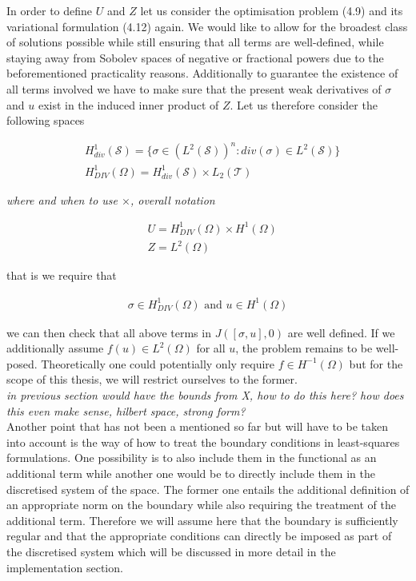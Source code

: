 \documentclass[../draft_1.tex]{subfiles}
\begin{document}
In order to define $U$ and $Z$ let us consider the optimisation problem (4.9) and its variational formulation (4.12) again. We would like to allow for the broadest class of solutions possible while still ensuring that all terms are well-defined, while staying away from Sobolev spaces of negative or fractional powers due to the beforementioned practicality reasons. Additionally to guarantee the existence of all terms involved we have to make sure that the present weak derivatives of $\sigma$ and $u$ exist in the induced inner product of $Z$. Let us therefore consider the following spaces 
\begin{ceqn}
	\begin{align}
	&H_{div}^1(\mathcal{S}) = \{\sigma \in (L^2(\mathcal{S}))^n : div (\sigma) \in L^2(\mathcal{S})\} \\
    &H_{DIV}^1(\Omega) = H_{div}^1(\mathcal{S}) \times L_2(\mathcal{T}) 
    	\end{align}
\end{ceqn}
\textit{where and when to use $\times$, overall notation}
\begin{ceqn}
	\begin{align}
    & U = H_{DIV}^1(\Omega) \times H^1(\Omega) \\
    & Z = L^2(\Omega)
	\end{align}
\end{ceqn}
that is we require that 
\begin{ceqn}
	\begin{align}
\sigma \in H_{DIV}^1(\Omega) \text{  and  } u \in H^1(\Omega) 
	\end{align}
\end{ceqn}
we can then check that all above terms in $J([\sigma, u], 0)$ are well defined. If we additionally assume $f(u) \in L^2(\Omega)$ for all $u$, the problem remains to be well-posed. Theoretically one could potentially only require $f \in H^{-1}(\Omega)$ but for the scope of this thesis, we will restrict ourselves to the former.
\bigskip
\\
\textit{in previous section would have the bounds from X, how to do this here? how does this even make sense, hilbert space, strong form?}
\bigskip 
\\
Another point that has not been a mentioned so far but will have to be taken into account is the way of how to treat the boundary conditions in least-squares formulations. One possibility is to also include them in the functional as an additional term while another one would be to directly include them in the discretised system of the space. The former one entails the additional definition of an appropriate norm on the boundary while also requiring the treatment of the additional term. Therefore we will assume here that the boundary is sufficiently regular and that the appropriate conditions can directly be imposed as part of the discretised system which will be discussed in more detail in the implementation section.
\end{document}

